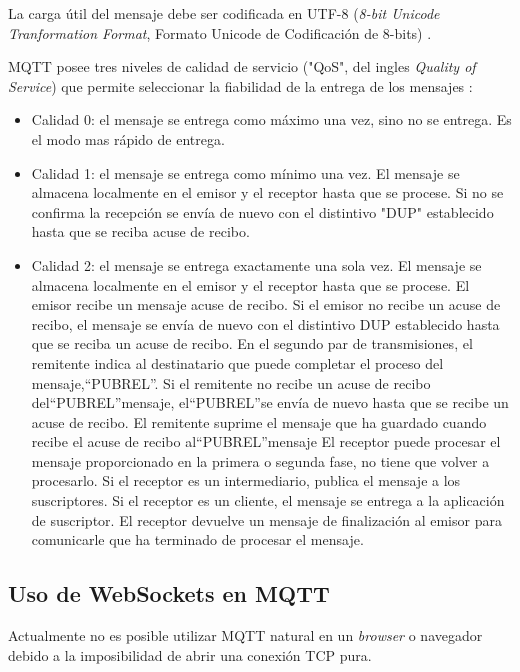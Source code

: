 La carga útil del mensaje debe ser codificada en UTF-8 (\textit{8-bit Unicode Tranformation Format}, Formato Unicode de Codificación de 8-bits) \citep{WEBSITE:5}.

MQTT posee tres niveles de calidad de servicio ("QoS", del ingles \textit{Quality of Service}) que permite seleccionar la fiabilidad de la entrega de los mensajes \citep{WEBSITE:5}\citep{WEBSITE:28} :

\begin{itemize}
\item Calidad 0: el mensaje se entrega como máximo una vez, sino no se entrega. Es el modo mas rápido de entrega.
\item Calidad 1: el mensaje se entrega como mínimo una vez. El mensaje se almacena localmente en el emisor y el receptor hasta que se procese. Si no se confirma la recepción se envía de nuevo con el distintivo "DUP" establecido hasta que se reciba acuse de recibo.
\item Calidad 2: el mensaje se entrega exactamente una sola vez. El mensaje se almacena localmente en el emisor y el receptor hasta que se procese. El emisor recibe un mensaje acuse de recibo. Si el emisor no recibe un acuse de recibo, el mensaje se envía de nuevo con el distintivo DUP establecido hasta que se reciba un acuse de recibo.
En el segundo par de transmisiones, el remitente indica al destinatario que puede completar el proceso del mensaje,“PUBREL”. Si el remitente no recibe un acuse de recibo del“PUBREL”mensaje, el“PUBREL”se envía de nuevo hasta que se recibe un acuse de recibo. El remitente suprime el mensaje que ha guardado cuando recibe el acuse de recibo al“PUBREL”mensaje
El receptor puede procesar el mensaje proporcionado en la primera o segunda fase, no tiene que volver a procesarlo. Si el receptor es un intermediario, publica el mensaje a los suscriptores. Si el receptor es un cliente, el mensaje se entrega a la aplicación de suscriptor. El receptor devuelve un mensaje de finalización al emisor para comunicarle que ha terminado de procesar el mensaje.

\end{itemize}


\label{subsec:WebSockets}
\subsection{Uso de WebSockets en MQTT}

Actualmente no es posible utilizar MQTT natural en un \textit{browser} o navegador debido a la imposibilidad de abrir una conexión TCP pura. 

